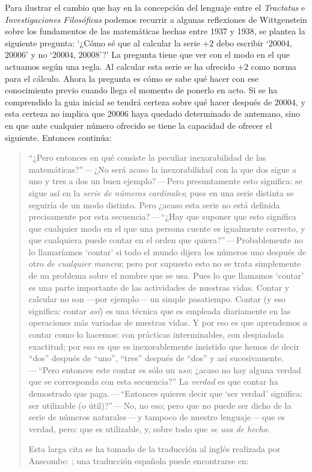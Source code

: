 Para ilustrar el cambio que hay en la concepción del lenguaje entre el \emph{Tractatus} e \emph{Investigaciones Filosóficas} podemos recurrir a algunas reflexiones de Wittgenstein sobre los fundamentos de las matemáticas hechas entre 1937 y 1938, se plantea la siguiente pregunta: \enquote*{¿Cómo sé que al calcular la serie $+2$ debo escribir `$20004$, $20006$' y no `$20004$, $20008$'?} La pregunta tiene que ver con el modo en el que actuamos según una regla. Al calcular esta serie se ha ofrecido $+2$ como norma para el cálculo. Ahora la pregunta es cómo se sabe qué hacer con ese conocimiento previo cuando llega el momento de ponerlo en acto. Si se ha comprendido la guia inicial se tendrá certeza sobre qué hacer después de $20004$, y esta certeza no implica que $20006$ haya quedado determinado de antemano, sino en que ante cualquier número ofrecido se tiene la capacidad de ofrecer el siguiente. Entonces continúa:
\blockquote[Esta larga cita se ha tomado de la traducción al inglés realizada por Anscombe: {\cite[I, \S4]{wittgenstein1956remmath}}; una traducción española puede encontrarse en: {\cite[17--18]{wittgenstein1956remmathes}}]{``¿Pero entonces en qué consiste la peculiar inexorabilidad de las matemáticas?''\,---\,¿No será acaso la inexorabilidad con la que dos sigue a uno y tres a dos un buen ejemplo?\,---\,Pero presuntamente esto significa: se sigue así en la \emph{serie de números cardinales}; pues en una serie distinta se seguiría de un modo distinto. Pero ¿acaso esta serie no está definida precisamente por esta secuencia?\,---\,``¿Hay que suponer que esto significa que cualquier modo en el que una persona cuente es igualmente correcto, y que cualquiera puede contar en el orden que quiera?''\,---\,Probablemente no lo llamaríamos `contar' si todo el mundo dijera los números uno después de otro \emph{de cualquier manera}; pero por supuesto esto no se trata simplemente de un problema sobre el nombre que se usa. Pues lo que llamamos `contar' es una parte importante de las actividades de nuestras vidas. Contar y calcular no son ---por ejemplo--- un simple pasatiempo. Contar (y eso significa: contar \emph{así}) es una técnica que es empleada diariamente en las operaciones más variadas de nuestras vidas. Y por eso es que aprendemos a contar como lo hacemos: con prácticas interminables, con despiadada exactitud; por eso es que es inexorablemente insistido que hemos de decir ``dos'' después de ``uno'', ``tres'' después de ``dos'' y así sucesivamente.\,---\,``Pero entonces este contar es sólo un \emph{uso}; ¿acaso no hay alguna verdad que se corresponda con esta secuencia?'' La \emph{verdad} es que contar ha demostrado que paga.\,---\,``Entonces quieres decir que `ser verdad' significa: ser utilizable (o útil)?''\,---\,No, no eso; pero que no puede ser dicho de la serie de números naturales\,---\,y tampoco de nuestro lenguaje\,---\,que es verdad, pero: que es utilizable, y, sobre todo que \emph{se usa de hecho}.}

